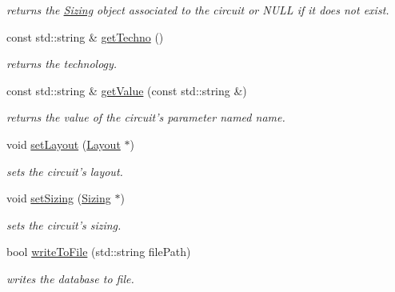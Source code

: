 \begin{DoxyCompactItemize}
\begin{DoxyCompactList}\small\item\em returns the \hyperlink{class_open_chams_1_1_sizing}{Sizing} object associated to the circuit or N\-U\-L\-L if it does not exist. \end{DoxyCompactList}\item 
\hypertarget{class_open_chams_1_1_circuit_a3538c326d799dd26fbb17c4ac6c4647e}{const std\-::string \& \hyperlink{class_open_chams_1_1_circuit_a3538c326d799dd26fbb17c4ac6c4647e}{get\-Techno} ()}\label{class_open_chams_1_1_circuit_a3538c326d799dd26fbb17c4ac6c4647e}

\begin{DoxyCompactList}\small\item\em returns the technology. \end{DoxyCompactList}\item 
const std\-::string \& \hyperlink{class_open_chams_1_1_circuit_a6650bf10e394fe2d6fa1d50e247da296}{get\-Value} (const std\-::string \&)
\begin{DoxyCompactList}\small\item\em returns the value of the circuit's parameter named {\ttfamily name}. \end{DoxyCompactList}\item 
void \hyperlink{class_open_chams_1_1_circuit_a4babcbc5b9f7797cc0befb675d5f538c}{set\-Layout} (\hyperlink{class_open_chams_1_1_layout}{Layout} $\ast$)
\begin{DoxyCompactList}\small\item\em sets the circuit's layout. \end{DoxyCompactList}\item 
void \hyperlink{class_open_chams_1_1_circuit_ab065572c5c1d9beb304324f2d2d8b525}{set\-Sizing} (\hyperlink{class_open_chams_1_1_sizing}{Sizing} $\ast$)
\begin{DoxyCompactList}\small\item\em sets the circuit's sizing. \end{DoxyCompactList}\item 
bool \hyperlink{class_open_chams_1_1_circuit_a2eb07935ec946a07edcee2255b781193}{write\-To\-File} (std\-::string file\-Path)
\begin{DoxyCompactList}\small\item\em writes the database to file. \end{DoxyCompactList}\end{DoxyCompactItemize}
